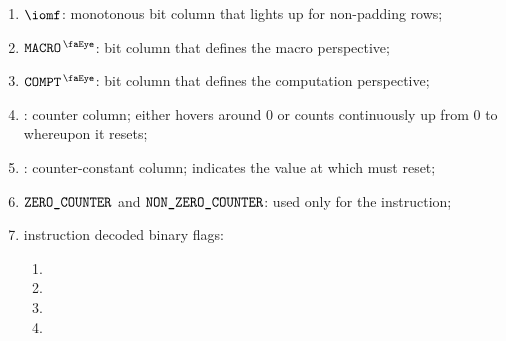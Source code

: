 \begin{enumerate}
    \item
	$\iomf$:
	monotonous bit column that lights up for non-padding rows;
    \item
	$\isRlpUtilsMacro$:
	bit column that defines the macro perspective;
    \item
	$\isRlpUtilsCompt$:
	bit column that defines the computation perspective;
    \item
	\ct{}:
	counter column; 
	either hovers around $0$ or counts continuously up from $0$ to \maxCt{} whereupon it resets;
    \item
	\maxCt:
	counter-constant column;
	indicates the value at which \ct{} must reset;
    \item
	$\texttt{ZERO\_COUNTER}$ and
	$\texttt{NON\_ZERO\_COUNTER}$:
	used only for the  instruction;
    \item
	instruction decoded binary flags:
	\begin{multicols}{2}
	    \begin{enumerate}
		\item \rlpUtilsInstIntegerFlag        {}
		\item \rlpUtilsInstByteStringPrefixFlag     {}
		\item \rlpUtilsInstBytesThirtyTwoFlag {}
		\item \rlpUtilsInstDataPricingFlag    {}
	    \end{enumerate}
	\end{multicols}
\end{enumerate}
